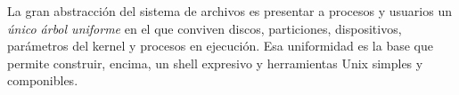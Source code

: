 \documentclass[11pt,a4paper]{article}
\begin{document}
\begin{idea}
La gran abstracción del sistema de archivos es presentar a procesos y
usuarios un \emph{único árbol uniforme} en el que conviven discos,
particiones, dispositivos, parámetros del kernel y procesos en
ejecución. Esa uniformidad es la base que permite construir, encima,
un shell expresivo y herramientas Unix simples y componibles.
\end{idea}
\end{document}
